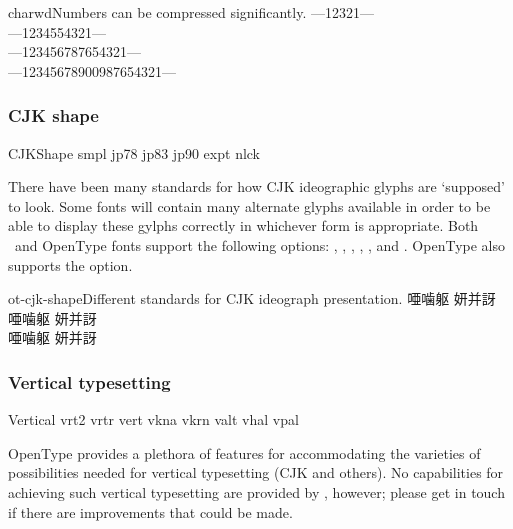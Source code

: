 \documentclass[a4paper]{l3doc}
\begin{document}
\begin{Xexample}[firstline=2]{charwd}{Numbers can be compressed significantly.}
  \centering
  {
   ---12321---}\\
  {
   ---1234554321---}\\
  {
   ---123456787654321---}\\
  {
   ---12345678900987654321---}
\end{Xexample}


\subsubsection{CJK shape}

\begin{features}{CJKShape}
 {smpl}
    {jp78}
    {jp83}
    {jp90}
     {expt}
        {nlck}
\end{features}

There have been many standards for how CJK ideographic
glyphs are `supposed' to look. Some fonts will contain many alternate
glyphs available in order to be able to display these gylphs
correctly in whichever form is appropriate. Both \AAT\ and OpenType
fonts support the following  options:
, , , ,
, and . OpenType also supports the  option.

\begin{Xexample}[firstline=2]{ot-cjk-shape}{Different standards for CJK ideograph presentation.}
  \LARGE\def\text{ 唖噛躯 妍并訝}
  {
  \text }                          \\
  {
  \text }                          \\
  {
  \text }
\end{Xexample}


\subsubsection{Vertical typesetting}

\begin{features}{Vertical}
         {vrt2}
 {vrtr}
            {vert}
        {vkna}
               {vkrn}
      {valt}
           {vhal}
   {vpal}
\end{features}

OpenType provides a plethora of features for accommodating the varieties of possibilities
needed for vertical typesetting (CJK and others).
No capabilities for achieving such vertical typesetting are provided by ,
however; please get in touch if there are improvements that could be made.
\end{document}
